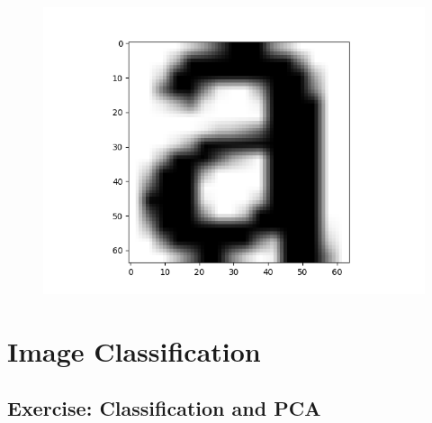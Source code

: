 \documentclass{article}
\begin{document}
\begin{figure}[H]
    \centering
    \includegraphics[width=1\textwidth]{../original-image.png}
\end{figure}

\section{Image Classification}
\subsection{Exercise: Classification and PCA}
\end{document}
